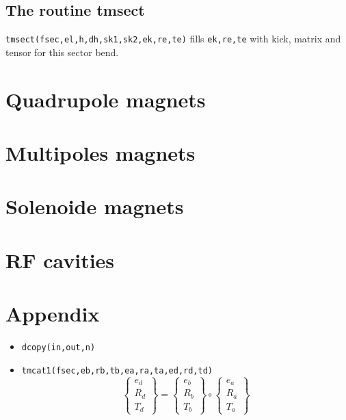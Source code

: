 \documentclass{cern-art} %
\renewcommand{\L}[1]{\lstinline[firstnumber=last]{#1}}
\begin{document}
\subsection{The routine {tmsect}}
\L{tmsect(fsec,el,h,dh,sk1,sk2,ek,re,te)} fills \L{ek,re,te} with kick, matrix and tensor for this sector bend.

\section{Quadrupole magnets}

\section{Multipoles magnets}

\section{Solenoide magnets}

\section{RF cavities}

\appendix
\section{Appendix}
\begin{itemize}
\item[-] \L{dcopy(in,out,n)}
\item[-] \L{tmcat1(fsec,eb,rb,tb,ea,ra,ta,ed,rd,td)}$$\left\{ \begin{array}{c}
e_{d}\\
R_{d}\\
T_{d}
\end{array}\right\} =\left\{ \begin{array}{c}
e_{b}\\
R_{b}\\
T_{b}
\end{array}\right\} \circ \left\{ \begin{array}{c}
e_{a}\\
R_{a}\\
T_{a}
\end{array}\right\} $$
\end{itemize}
\end{document}
